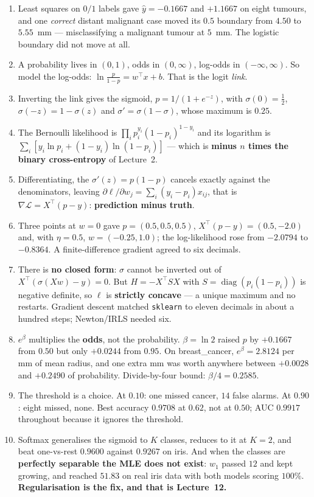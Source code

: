\documentclass[11pt]{article}
\begin{document}
\begin{enumerate}[leftmargin=*]
  \item Least squares on $0/1$ labels gave $\hat y = -0.1667$ and $+1.1667$ on
    eight tumours, and one \emph{correct} distant malignant case moved its
    $0.5$ boundary from $4.50$ to $5.55$~mm --- misclassifying a malignant
    tumour at $5$~mm. The logistic boundary did not move at all.
  \item A probability lives in $(0,1)$, odds in $(0,\infty)$, log-odds in
    $(-\infty,\infty)$. So model the log-odds:
    $\ln\frac{p}{1-p} = w^{\!\top}x + b$. That is the logit \emph{link}.
  \item Inverting the link gives the sigmoid,
    $p = 1/(1+e^{-z})$, with $\sigma(0)=\tfrac12$, $\sigma(-z)=1-\sigma(z)$
    and $\sigma' = \sigma(1-\sigma)$, whose maximum is $0.25$.
  \item The Bernoulli likelihood is
    $\prod_i p_i^{y_i}(1-p_i)^{1-y_i}$ and its logarithm is
    $\sum_i [y_i\ln p_i + (1-y_i)\ln(1-p_i)]$ --- which is \textbf{minus $n$
    times the binary cross-entropy} of Lecture~2.
  \item Differentiating, the $\sigma'(z) = p(1-p)$ cancels exactly against the
    denominators, leaving
    $\partial\ell/\partial w_j = \sum_i (y_i - p_i)x_{ij}$, that is
    $\nabla\mathcal{L} = X^{\!\top}(p - y)$: \textbf{prediction minus truth}.
  \item Three points at $w = 0$ gave $p = (0.5,0.5,0.5)$,
    $X^{\!\top}(p-y) = (0.5, -2.0)$ and, with $\eta = 0.5$,
    $w = (-0.25, 1.0)$; the log-likelihood rose from $-2.0794$ to $-0.8364$.
    A finite-difference gradient agreed to six decimals.
  \item There is \textbf{no closed form}: $\sigma$ cannot be inverted out of
    $X^{\!\top}(\sigma(Xw) - y) = 0$. But $H = -X^{\!\top}SX$ with
    $S = \operatorname{diag}(p_i(1-p_i))$ is negative definite, so $\ell$ is
    \textbf{strictly concave} --- a unique maximum and no restarts. Gradient
    descent matched \texttt{sklearn} to eleven decimals in about a hundred
    steps; Newton/IRLS needed six.
  \item $e^{\beta}$ multiplies the \textbf{odds}, not the probability.
    $\beta = \ln 2$ raised $p$ by $+0.1667$ from $0.50$ but only $+0.0244$
    from $0.95$. On breast\_cancer, $e^{\beta} = 2.8124$ per mm of mean
    radius, and one extra mm was worth anywhere between $+0.0028$ and
    $+0.2490$ of probability. Divide-by-four bound: $\beta/4 = 0.2585$.
  \item The threshold is a choice. At $0.10$: one missed cancer, $14$ false
    alarms. At $0.90$: eight missed, none. Best accuracy $0.9708$ at $0.62$,
    not at $0.50$; AUC $0.9917$ throughout because it ignores the threshold.
  \item Softmax generalises the sigmoid to $K$ classes, reduces to it at
    $K = 2$, and beat one-vs-rest $0.9600$ against $0.9267$ on iris. And when
    the classes are \textbf{perfectly separable the MLE does not exist}:
    $w_1$ passed $12$ and kept growing, and reached $51.83$ on real iris data
    with both models scoring $100\%$. \textbf{Regularisation is the fix, and
    that is Lecture~12.}
\end{enumerate}
\end{document}
